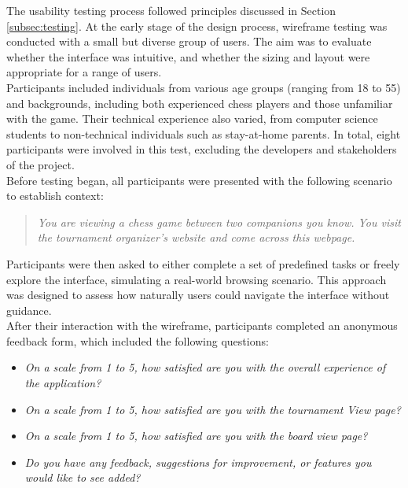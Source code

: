 The usability testing process followed principles discussed in Section \ref{subsec:testing}. At the early stage of the design process, wireframe testing was conducted with a small but diverse group of users. The aim was to evaluate whether the interface was intuitive, and whether the sizing and layout were appropriate for a range of users. \\

Participants included individuals from various age groups (ranging from 18 to 55) and backgrounds, including both experienced chess players and those unfamiliar with the game. Their technical experience also varied, from computer science students to non-technical individuals such as stay-at-home parents. In total, eight participants were involved in this test, excluding the developers and stakeholders of the project. \\

Before testing began, all participants were presented with the following scenario to establish context:

\begin{quote}
\textit{You are viewing a chess game between two companions you know. You visit the tournament organizer's website and come across this webpage.}
\end{quote}

Participants were then asked to either complete a set of predefined tasks or freely explore the interface, simulating a real-world browsing scenario. This approach was designed to assess how naturally users could navigate the interface without guidance. \\

After their interaction with the wireframe, participants completed an anonymous feedback form, which included the following questions:

\begin{itemize}
    \item \textit{On a scale from 1 to 5, how satisfied are you with the overall experience of the application?}
    \item \textit{On a scale from 1 to 5, how satisfied are you with the tournament View page?}
    \item \textit{On a scale from 1 to 5, how satisfied are you with the board view page?}
    \item \textit{Do you have any feedback, suggestions for improvement, or features you would like to see added?}
\end{itemize}

